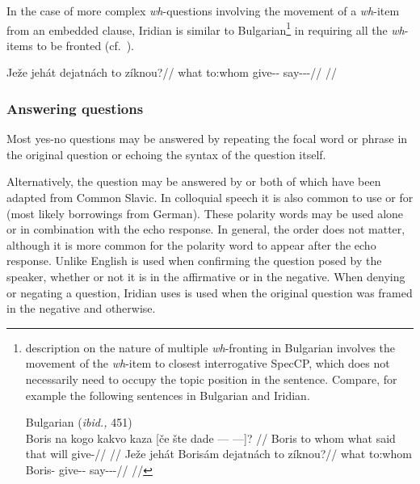 In the case of more complex \emph{wh}-questions involving the movement of a
  \emph{wh}-item from an embedded clause, Iridian is similar to
  Bulgarian\footnote{  description on the nature of multiple
  \emph{wh}-fronting in Bulgarian involves the movement of the
  \emph{wh}-item to closest interrogative SpecCP, which does not necessarily
  need to occupy the topic position in the sentence. Compare, for example the
  following sentences in Bulgarian and Iridian.

  \ex[lingstyle=fnex,belowexskip=-1em,aboveglftskip=1pt]
  Bulgarian (\emph{ibid.,} 451)\smallskip\\
    \begingl 
    \gla Boris na kogo kakvo kaza [če šte {dade --- ---]}? //
    \glb Boris to whom what said that will give-\Third{}\Sg{}//
    \glft {}//
  \endgl
  \xe
\smallskip
  \ex[lingstyle=fnex,belowexskip=-1em,aboveglftskip=1pt]
    \begingl 
    \gla Ježe jehát Borisám dejatnách to zíknou?//
    \glb what to:whom Boris-\Agt{} give-\Pv{}-\Ctp{} \Rz{} say-\Pv{}-\Pf{}-\Nz{}//
    \glft {}//
  \endgl
  \xe

} in requiring all the \emph{wh}-items to be fronted (cf.~\cite[450]{rudin1988}).

\pex
\begingl
\gla Ježe jehát dejatnách to zíknou?//
\glb what to:whom give-\Pv{}-\Ctp{} \Rz{} say-\Pv{}-\Pf{}-\Nz{}//
\glft {}//
\endgl
\xe


\subsubsection{Answering questions}\label{sec:ansyn}

Most yes-no questions may be answered by repeating the focal word or phrase in
the original question or echoing the syntax of the question itself.

\ex
{}
\xe

Alternatively, the question may be answered by  or 
both of which have been adapted from Common Slavic. In
colloquial speech it is also common to use  or  for 
(most likely borrowings from German). These polarity words may be
used alone or in combination with the echo response. In general, the order does
not matter, although it is more common for the polarity word to appear after the
echo response. Unlike English   is used when confirming the
question posed by the speaker, whether or not it is in the affirmative or in the
negative. When denying or negating a question, Iridian uses  is used
when the original question was framed in the negative and  otherwise.

